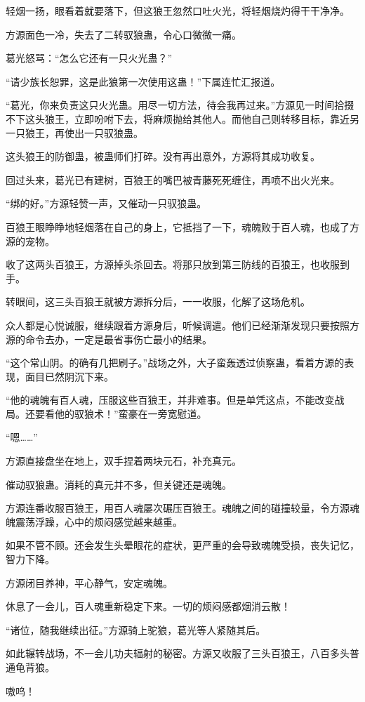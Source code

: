 \begin{this_body}
轻烟一扬，眼看着就要落下，但这狼王忽然口吐火光，将轻烟烧灼得干干净净。

方源面色一冷，失去了二转驭狼蛊，令心口微微一痛。

葛光怒骂：“怎么它还有一只火光蛊？”

“请少族长恕罪，这是此狼第一次使用这蛊！”下属连忙汇报道。

“葛光，你来负责这只火光蛊。用尽一切方法，待会我再过来。”方源见一时间拾掇不下这头狼王，立即吩咐下去，将麻烦抛给其他人。而他自己则转移目标，靠近另一只狼王，再使出一只驭狼蛊。

这头狼王的防御蛊，被蛊师们打碎。没有再出意外，方源将其成功收复。

回过头来，葛光已有建树，百狼王的嘴巴被青藤死死缠住，再喷不出火光来。

“绑的好。”方源轻赞一声，又催动一只驭狼蛊。

百狼王眼睁睁地轻烟落在自己的身上，它抵挡了一下，魂魄败于百人魂，也成了方源的宠物。

收了这两头百狼王，方源掉头杀回去。将那只放到第三防线的百狼王，也收服到手。

转眼间，这三头百狼王就被方源拆分后，一一收服，化解了这场危机。

众人都是心悦诚服，继续跟着方源身后，听候调遣。他们已经渐渐发现只要按照方源的命令去办，一定是最省事伤亡最小的结果。

“这个常山阴。的确有几把刷子。”战场之外，大子蛮轰透过侦察蛊，看着方源的表现，面目已然阴沉下来。

“他的魂魄有百人魂，压服这些百狼王，并非难事。但是单凭这点，不能改变战局。还要看他的驭狼术！”蛮豪在一旁宽慰道。

“嗯……”

方源直接盘坐在地上，双手捏着两块元石，补充真元。

催动驭狼蛊。消耗的真元并不多，但关键还是魂魄。

方源连番收服百狼王，用百人魂屡次碾压百狼王。魂魄之间的碰撞较量，令方源魂魄震荡浮躁，心中的烦闷感觉越来越重。

如果不管不顾。还会发生头晕眼花的症状，更严重的会导致魂魄受损，丧失记忆，智力下降。

方源闭目养神，平心静气，安定魂魄。

休息了一会儿，百人魂重新稳定下来。一切的烦闷感都烟消云散！

“诸位，随我继续出征。”方源骑上驼狼，葛光等人紧随其后。

如此辗转战场，不一会儿功夫辐射的秘密。方源又收服了三头百狼王，八百多头普通龟背狼。

嗷呜！


\end{this_body}
